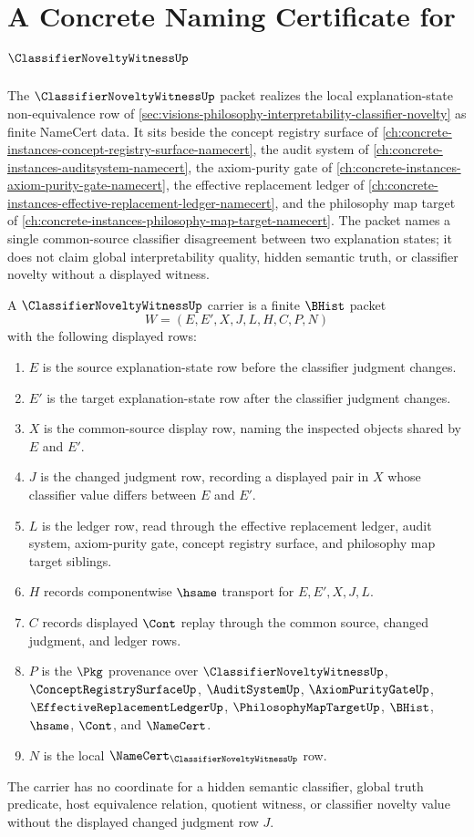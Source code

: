 \chapter{A Concrete Naming Certificate for $\ClassifierNoveltyWitnessUp$}
\label{ch:concrete-instances-classifier-novelty-witness-namecert}

The $\ClassifierNoveltyWitnessUp$ packet realizes the local explanation-state non-equivalence row of \autoref{sec:visions-philosophy-interpretability-classifier-novelty} as finite NameCert data. It sits beside the concept registry surface of \autoref{ch:concrete-instances-concept-registry-surface-namecert}, the audit system of \autoref{ch:concrete-instances-auditsystem-namecert}, the axiom-purity gate of \autoref{ch:concrete-instances-axiom-purity-gate-namecert}, the effective replacement ledger of \autoref{ch:concrete-instances-effective-replacement-ledger-namecert}, and the philosophy map target of \autoref{ch:concrete-instances-philosophy-map-target-namecert}. The packet names a single common-source classifier disagreement between two explanation states; it does not claim global interpretability quality, hidden semantic truth, or classifier novelty without a displayed witness.

\begin{definition}
\label{def:classifier-novelty-witness-carrier}
A $\ClassifierNoveltyWitnessUp$ carrier is a finite $\BHist$ packet
$$
W=(E,E',X,J,L,H,C,P,N)
$$
with the following displayed rows:
\begin{enumerate}
\item $E$ is the source explanation-state row before the classifier judgment changes.
\item $E'$ is the target explanation-state row after the classifier judgment changes.
\item $X$ is the common-source display row, naming the inspected objects shared by $E$ and $E'$.
\item $J$ is the changed judgment row, recording a displayed pair in $X$ whose classifier value differs between $E$ and $E'$.
\item $L$ is the ledger row, read through the effective replacement ledger, audit system, axiom-purity gate, concept registry surface, and philosophy map target siblings.
\item $H$ records componentwise $\hsame$ transport for $E,E',X,J,L$.
\item $C$ records displayed $\Cont$ replay through the common source, changed judgment, and ledger rows.
\item $P$ is the $\Pkg$ provenance over $\ClassifierNoveltyWitnessUp$, $\ConceptRegistrySurfaceUp$, $\AuditSystemUp$, $\AxiomPurityGateUp$, $\EffectiveReplacementLedgerUp$, $\PhilosophyMapTargetUp$, $\BHist$, $\hsame$, $\Cont$, and $\NameCert$.
\item $N$ is the local $\NameCert_{\ClassifierNoveltyWitnessUp}$ row.
\end{enumerate}
The carrier has no coordinate for a hidden semantic classifier, global truth predicate, host equivalence relation, quotient witness, or classifier novelty value without the displayed changed judgment row $J$.
\end{definition}

